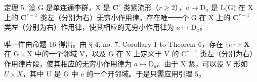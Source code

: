 定理 5. 设 G 是单连通李群，X 是 \(\mathbf{C}^r\) 类紧流形（\(r \geqslant 2\)），\(a \mapsto \mathrm{D}_a\) 是 L(G) 在 X 上的 \(\mathbf{C}^{r-1}\) 类左（分别为右）无穷小作用律。存在唯一一个 G 在 X 上的 \(\mathbf{C}^{r-1}\) 类左（分别为右）作用律，使其相应的无穷小作用律为 \(a \mapsto \mathrm{D}_a\)。

唯一性由命题 16 得出。由 § 4, no. 7, Corollary 1 to Theorem 6，存在 \(\{e\} \times \mathbf{X}\) 在 \(\mathrm{G} \times \mathrm{X}\) 中的一个邻域 V，以及 G 在 X 上定义于 V 的 \(\mathrm{C}^{r-1}\) 类左（分别为右）作用律片段，使其相应的无穷小作用律为 \(a \mapsto \mathrm{D}_a\)。由于 X 紧，可以设 V 形如 \(U \times X\)，其中 U 是 G 中 e 的一个开邻域。于是只需应用引理 5。
\relax{}
